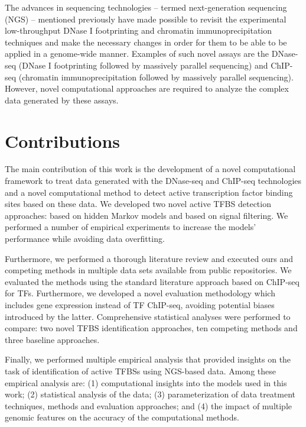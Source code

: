 The advances in sequencing technologies -- termed next-generation sequencing (NGS) -- mentioned previously have made possible to revisit the experimental low-throughput DNase I footprinting and chromatin immunoprecipitation techniques and make the necessary changes in order for them to be able to be applied in a genome-wide manner. Examples of such novel assays are the DNase-seq (DNase I footprinting followed by massively parallel sequencing) and ChIP-seq (chromatin immunoprecipitation followed by massively parallel sequencing). However, novel computational approaches are required to analyze the complex data generated by these assays.

\section{Contributions}
\label{sec:contributions}

The main contribution of this work is the development of a novel computational framework to treat data generated with the DNase-seq and ChIP-seq technologies and a novel computational method to detect active transcription factor binding sites based on these data. We developed two novel active TFBS detection approaches: based on hidden Markov models and based on signal filtering. We performed a number of empirical experiments to increase the models' performance while avoiding data overfitting.

Furthermore, we performed a thorough literature review and executed ours and competing methods in multiple data sets available from public repositories. We evaluated the methods using the standard literature approach based on ChIP-seq for TFs. Furthermore, we developed a novel evaluation methodology which includes gene expression instead of TF ChIP-seq, avoiding potential biases introduced by the latter. Comprehensive statistical analyses were performed to compare: two novel TFBS identification approaches, ten competing methods and three baseline approaches.

Finally, we performed multiple empirical analysis that provided insights on the task of identification of active TFBSs using NGS-based data. Among these empirical analysis are: (1) computational insights into the models used in this work; (2) statistical analysis of the data; (3) parameterization of data treatment techniques, methods and evaluation approaches; and (4) the impact of multiple genomic features on the accuracy of the computational methods.

